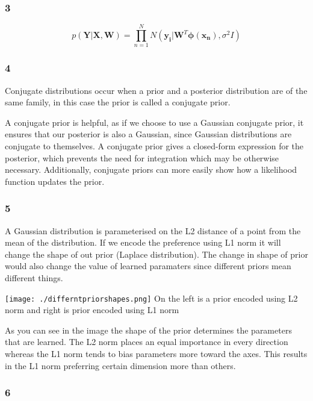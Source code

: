 \documentclass[11pt]{article}
\begin{document}
    \subsubsection*{3}\label{section}

\[
p(\mathbf{Y} | \mathbf{X}, \mathbf{W}) = \prod_{n=1}^{N} N(\boldsymbol{y_i} | \boldsymbol{W}^T\boldsymbol{\phi}(\boldsymbol{x_n}), \sigma^2 I)
\]

    \subsubsection*{4}\label{section}

Conjugate distributions occur when a prior and a posterior distribution
are of the same family, in this case the prior is called a conjugate
prior.

A conjugate prior is helpful, as if we choose to use a Gaussian
conjugate prior, it ensures that our posterior is also a Gaussian, since
Gaussian distributions are conjugate to themselves. A conjugate prior
gives a closed-form expression for the posterior, which prevents the
need for integration which may be otherwise necessary. Additionally,
conjugate priors can more easily show how a likelihood function updates
the prior.

    \subsubsection*{5}\label{section}

A Gaussian distribution is parameterised on the L2 distance of a point
from the mean of the distribution. If we encode the preference using L1
norm it will change the shape of out prior (Laplace distribution). The
change in shape of prior would also change the value of learned
paramaters since different priors mean different things.

\texttt{[image: ./differntpriorshapes.png]} On the left is a
prior encoded using L2 norm and right is prior encoded using L1 norm

As you can see in the image the shape of the prior determines the
parameters that are learned. The L2 norm places an equal importance in
every direction whereas the L1 norm tends to bias parameters more toward
the axes. This results in the L1 norm preferring certain dimension more
than others.

    \subsubsection*{6}\label{section}
\end{document}

